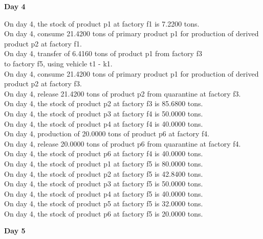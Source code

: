 \textbf{Day 4}
\vspace{-1.6em}
\begin{tabbing}
On day 4, the stock of product p1 at factory f1 is 7.2200 tons. \\
On day 4, consume 21.4200 tons of primary product p1 for production of derived product p2 at factory f1. \\
On day 4, transfer of 6.4160 tons of product p1 from factory f3 \\ to factory f5, using vehicle t1 - k1. \\
On day 4, consume 21.4200 tons of primary product p1 for production of derived product p2 at factory f3. \\
On day 4, release 21.4200 tons of product p2 from quarantine at factory f3. \\
On day 4, the stock of product p2 at factory f3 is 85.6800 tons. \\
On day 4, the stock of product p3 at factory f4 is 50.0000 tons. \\
On day 4, the stock of product p4 at factory f4 is 40.0000 tons. \\
On day 4, production of 20.0000 tons of product p6 at factory f4. \\
On day 4, release 20.0000 tons of product p6 from quarantine at factory f4. \\
On day 4, the stock of product p6 at factory f4 is 40.0000 tons. \\
On day 4, the stock of product p1 at factory f5 is 80.0000 tons. \\
On day 4, the stock of product p2 at factory f5 is 42.8400 tons. \\
On day 4, the stock of product p3 at factory f5 is 50.0000 tons. \\
On day 4, the stock of product p4 at factory f5 is 40.0000 tons. \\
On day 4, the stock of product p5 at factory f5 is 32.0000 tons. \\
On day 4, the stock of product p6 at factory f5 is 20.0000 tons. \\
\end{tabbing} \vspace{-2.0em}
\textbf{Day 5}
\vspace{-1.6em}
